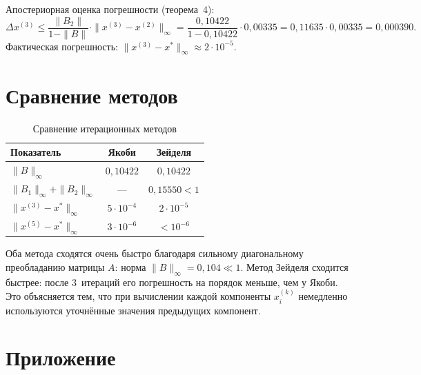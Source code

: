 \documentclass[a4paper, final]{article}
\begin{document}
Апостериорная оценка погрешности (теорема~4):
\[
\Delta x^{(3)} \leq \frac{\|B_2\|}{1-\|B\|}\cdot\|x^{(3)}-x^{(2)}\|_\infty
= \frac{0{,}10422}{1-0{,}10422}\cdot 0{,}00335
= 0{,}11635\cdot 0{,}00335 = 0{,}000390.
\]
Фактическая погрешность: $\|x^{(3)}-x^*\|_\infty \approx 2\cdot10^{-5}.$

\newpage

\section{Сравнение методов}

\begin{table}[h!]
\centering
\caption{Сравнение итерационных методов}
\label{tab:compare}
\renewcommand{\arraystretch}{1.4}
\begin{tabular}{|l|c|c|}
\hline
Показатель & Якоби & Зейделя \\
\hline
$\|B\|_\infty$ & $0{,}10422$ & $0{,}10422$ \\
\hline
$\|B_1\|_\infty + \|B_2\|_\infty$ & --- & $0{,}15550 < 1$ \\
\hline
$\|x^{(3)}-x^*\|_\infty$ & $5\cdot10^{-4}$ & $2\cdot10^{-5}$ \\
\hline
$\|x^{(5)}-x^*\|_\infty$ & $3\cdot10^{-6}$ & $<10^{-6}$ \\
\hline
\end{tabular}
\end{table}

Оба метода сходятся очень быстро благодаря сильному диагональному преобладанию
матрицы $A$: норма $\|B\|_\infty = 0{,}104 \ll 1$. Метод Зейделя сходится
быстрее: после 3~итераций его погрешность на порядок меньше, чем у Якоби.
Это объясняется тем, что при вычислении каждой компоненты $x_i^{(k)}$
немедленно используются уточнённые значения предыдущих компонент.

\newpage

\section*{Приложение}
\end{document}
